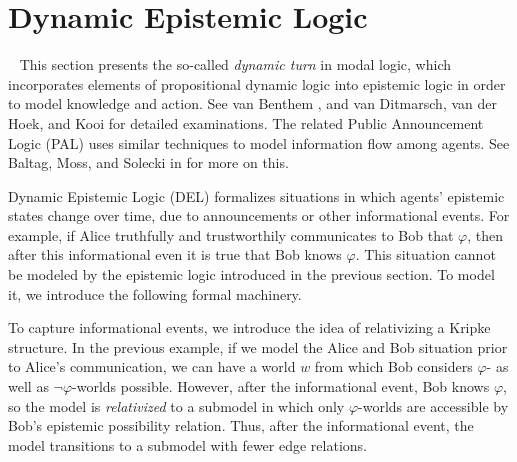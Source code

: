 
\section{Dynamic Epistemic Logic}~\label{sec:delsection}
This section presents the so-called \emph{dynamic turn} in modal logic, which incorporates elements of propositional dynamic logic into epistemic logic in order to model knowledge and action. See van Benthem \cite{VB_LDII,VB_MLOM,VB_TowardPlay}, and van Ditmarsch, van der Hoek, and Kooi \cite{DEL} for detailed examinations. The related Public Announcement Logic (PAL) uses similar techniques to model information flow among agents. See Baltag, Moss, and Solecki in \cite{BMS} for more on this.

Dynamic Epistemic Logic (DEL) formalizes situations in which agents' epistemic states change over time, due to announcements or other informational events\cite{DEL}. For example, if Alice truthfully and trustworthily communicates to Bob that $\varphi$, then after this informational even it is true that Bob knows $\varphi$. This situation cannot be modeled by the epistemic logic introduced in the previous section. To model it, we introduce the following formal machinery.

To capture informational events, we introduce the idea of relativizing a Kripke structure. In the previous example, if we model the Alice and Bob situation prior to Alice's communication, we can have a world $w$ from which Bob considers $\varphi$- as well as $\neg\varphi$-worlds possible. However, after the informational event, Bob knows $\varphi$, so the model is \emph{relativized} to a submodel in which only $\varphi$-worlds are accessible by Bob's epistemic possibility relation. Thus, after the informational event, the model transitions to a submodel with fewer edge relations.

